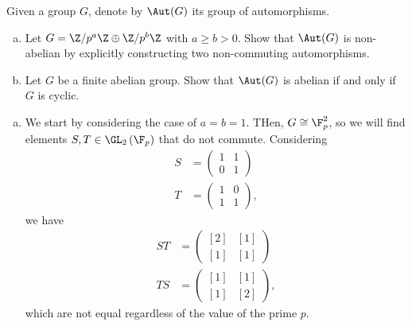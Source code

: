 \documentclass[10pt]{mypackage}
\begin{document}
\begin{problem}[Problem 2]
  Given a group $G$, denote by $\Aut(G)$ its group of automorphisms.
  \begin{enumerate}[(a)]
    \item Let $G = \Z/p^{a}\Z\oplus \Z/p^{b}\Z$ with $a\geq b > 0$. Show that $\Aut(G)$ is non-abelian by explicitly constructing two non-commuting automorphisms.
    \item Let $G$ be a finite abelian group. Show that $\Aut(G)$ is abelian if and only if $G$ is cyclic.
  \end{enumerate}
\end{problem}
\begin{solution}\hfill
  \begin{enumerate}[(a)]
    \item We start by considering the case of $a = b = 1$. THen, $G\cong \F_p^{2}$, so we will find elements $S,T\in \GL_2\left( \F_p \right)$ that do not commute. Considering
      \begin{align*}
        S &= \begin{pmatrix}1 & 1 \\ 0 & 1\end{pmatrix}\\
        T &= \begin{pmatrix}1 & 0 \\ 1 & 1\end{pmatrix},
      \end{align*}
      we have
      \begin{align*}
        ST &= \begin{pmatrix}\left[ 2 \right] & \left[ 1 \right]\\ \left[ 1 \right] & \left[ 1 \right]\end{pmatrix}\\
      TS &= \begin{pmatrix}\left[ 1 \right] & \left[ 1 \right]\\\left[ 1 \right] & \left[ 2 \right]\end{pmatrix},
      \end{align*}
      which are not equal regardless of the value of the prime $p$.


\end{enumerate}
\end{solution}
\end{document}
